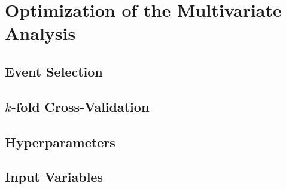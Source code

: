 \chapter{Optimization of the Multivariate Analysis}\label{cha:mva_strategy}

\section{Event Selection}\label{sec:event}

\section{$k$-fold Cross-Validation}\label{sec:_k_fold_cross_validation}

\section{Hyperparameters}\label{sec:hyperparameters}

\section{Input Variables}\label{sec:input_variables}
